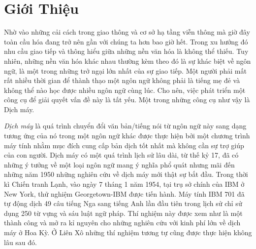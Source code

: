 
\chapter{Giới Thiệu }
\ifpdf
    \graphicspath{{Chapter1/Chapter1Figs/PNG/}{Chapter1/Chapter1Figs/PDF/}{Chapter1/Chapter1Figs/}}
\else
    \graphicspath{{Chapter1/Chapter1Figs/EPS/}{Chapter1/Chapter1Figs/}}
\fi


Nhờ vào những cải cách trong giao thông và cơ sở hạ tầng viễn thông mà giờ đây toàn cầu hóa đang trở nên gần với chúng ta hơn bao giờ hết. Trong xu hướng đó nhu cầu giao tiếp và thông hiểu giữa những nền văn hóa là không thể thiếu. Tuy nhiên, những nền văn hóa khác nhau thường kèm theo đó là sự khác biệt về ngôn ngữ, là một trong những trở ngại lớn nhất của sự giao tiếp. Một người phải mất rất nhiều thời gian để thành thạo một ngôn ngữ không phải là tiếng mẹ đẻ và không thể nào học được nhiều ngôn ngữ cùng lúc. Cho nên, việc phát triển một công cụ để giải quyết vấn đề này là tất yếu. Một trong những công cụ như vậy là Dịch máy.

\textit{Dịch máy} là quá trình chuyển đổi văn bản/tiếng nói từ ngôn ngữ này sang dạng tương ứng của nó trong một ngôn ngữ khác được thực hiện bởi một chương trình máy tính nhằm mục đích cung cấp bản dịch tốt nhất mà không cần sự trợ giúp của con người. Dịch máy có một quá trình lịch sử lâu dài, từ thế kỷ 17, đã có những ý tưởng về một loại ngôn ngữ mang ý nghĩa phổ quát nhưng mãi đến những năm 1950 những nghiên cứu về dịch máy mới thật sự bắt đầu. Trong thời kì Chiến tranh Lạnh, vào ngày 7 tháng 1 năm 1954, tại trụ sở chính của IBM ở New York, thử nghiệm Georgetown-IBM được tiến hành. Máy tính IBM 701 đã tự động dịch 49 câu tiếng Nga sang tiếng Anh lần đầu tiên trong lịch sử chỉ sử dụng 250 từ vựng và sáu luật ngữ pháp. Thí nghiệm này được xem như là một thành công và mở ra kỉ nguyên cho những nghiên cứu với kinh phí lớn về dịch máy ở Hoa Kỳ. Ở Liên Xô những thí nghiệm tương tự cũng được thực hiện không lâu sau đó.

